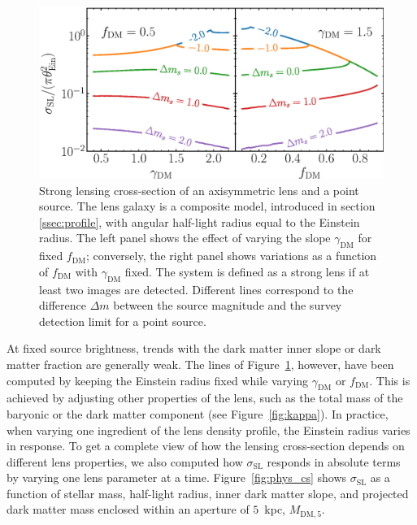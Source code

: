 \documentclass{aa}
\def\reff{R_{\mathrm{e}}}
\def\mstar{M_*}
\def\gammadm{\gamma_{\mathrm{DM}}}
\def\fdm{f_{\mathrm{DM}}}
\def\mdmfive{M_{\mathrm{DM}, 5}}
\def\tein{\theta_{\mathrm{Ein}}}
\def\crosssect{\sigma_\mathrm{{SL}}}
\def\Fref#1{Figure~\ref{#1}\xspace}
\begin{document}
\begin{figure}
\includegraphics[width=\columnwidth]{axisymm_composite_crosssect.eps}
\caption{
Strong lensing cross-section of an axisymmetric lens and a point source.
The lens galaxy is a composite model, introduced in section \ref{ssec:profile}, with angular half-light radius equal to the Einstein radius.
The left panel shows the effect of varying the slope $\gammadm$ for fixed $\fdm$; conversely, the right panel shows variations as a function of $\fdm$ with $\gammadm$ fixed.
The system is defined as a strong lens if at least two images are detected.
Different lines correspond to the difference $\Delta m$ between the source magnitude and the survey detection limit for a point source.
\label{fig:fixedap_cs}
}
\end{figure}

At fixed source brightness, trends with the dark matter inner slope or dark matter fraction are generally weak.
The lines of \Fref{fig:fixedap_cs}, however, have been computed by keeping the Einstein radius fixed while varying $\gammadm$ or $\fdm$.
This is achieved by adjusting other properties of the lens, such as the total mass of the baryonic or the dark matter component (see \Fref{fig:kappa}). 
In practice, when varying one ingredient of the lens density profile, the Einstein radius varies in response.
To get a complete view of how the lensing cross-section depends on different lens properties, we also computed how $\crosssect$ responds in absolute terms by varying one lens parameter at a time.
\Fref{fig:phys_cs} shows $\crosssect$ as a function of stellar mass, half-light radius, inner dark matter slope, and projected dark matter mass enclosed within an aperture of $5$~kpc, $\mdmfive$.
\end{document}

